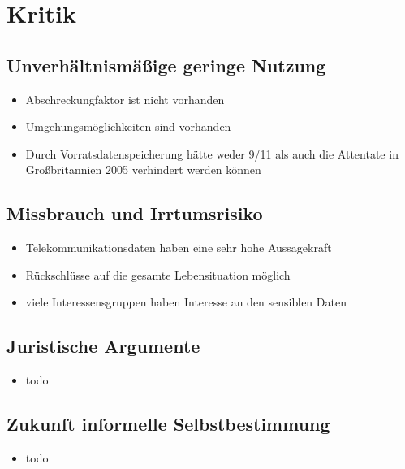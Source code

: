 
\section{Kritik}
  \subsection{Unverhältnismäßige geringe Nutzung}
    \begin{frame}
      \begin{itemize}
        \item
          Abschreckungfaktor ist nicht vorhanden
         \item
         Umgehungsmöglichkeiten sind vorhanden
        \item
       	Durch Vorratsdatenspeicherung hätte weder 9/11 als auch die Attentate in Großbritannien 2005 verhindert werden können


      \end{itemize}
    \end{frame}


  \subsection{Missbrauch und Irrtumsrisiko}
    \begin{frame}
      \begin{itemize}
        \item
          Telekommunikationsdaten haben eine sehr hohe Aussagekraft
        \item
          Rückschlüsse auf die gesamte Lebensituation möglich
 \item viele Interessensgruppen haben Interesse an den sensiblen Daten
      \end{itemize}
    \end{frame}

  \subsection{Juristische Argumente}
    \begin{frame}
      \begin{itemize}
        \item
         todo
  

      \end{itemize}
    \end{frame}

  \subsection{Zukunft informelle Selbstbestimmung}
    \begin{frame}
      \begin{itemize}
        \item
          todo
  

      \end{itemize}
    \end{frame}

